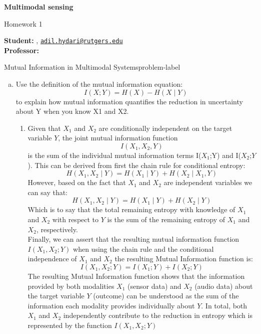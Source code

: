 




	
	\begin{Large}
		\textsf{\textbf{Multimodal sensing}}
		
		Homework 1
	\end{Large}
	
	\vspace{1ex}
	
	\textsf{\textbf{Student:}} , \href{mailto:adil.hydari@rutgers.edu}{\texttt{adil.hydari@rutgers.edu}}\\
	\textsf{\textbf{Professor:}} 
	
	
	\vspace{2ex}
	
	\begin{problem}{Mutual Information in Multimodal Systems}{problem-label}
		\begin{enumerate}[(a)]
			\item Use the definition of the mutual information equation:
			\[
			I(X;Y) = H(X) - H(X \mid Y)
			\]
			to explain how mutual information quantifies the reduction in uncertainty about Y when you know X1 and X2.
			\begin{enumerate}[label = (\roman*)]
				\item Given that $X_1$ and $X_2$ are conditionally independent on the target variable $Y$, the joint mutual information function \[ I(X_1,X_2,Y) \] is the sum of the individual mutual information terms I($X_1$;Y) and I($X_2$;$Y$). This can be derived from first the chain rule for conditional entropy: \[ H(X_1, X_2 \mid Y) = H(X_1 \mid Y) + H(X_2 \mid X_1, Y) \] 
				However, based on the fact that $X_1$ and $X_2$ are independent variables we can say that: 
				\[ H(X_1, X_2 \mid Y) = H(X_1 \mid Y) + H(X_2 \mid Y) \] 
				Which is to say that the total remaining entropy with knowledge of $X_1$ and $X_2$ with respect to $Y$ is the sum of the remaining entropy of $X_1$ and $X_2$, respectively.\\
				Finally, we can assert that the resulting mutual information function  $ I(X_1, X_2; Y) $ when using the chain rule and the conditional independence of $X_1$ and $X_2$ the resulting Mutual Information function is:
				 \[ I(X_1, X_2; Y) = I(X_1; Y) + I(X_2; Y) \]
				The resulting Mutual Information function shows that the information provided by both modalities $X_1$ (sensor data) and $X_2$ (audio data) about the target variable $Y$ (outcome) can be understood as the sum of the information each modality provides individually about $Y$. In total, both $X_1$ and $X_2$ independently contribute to the reduction in entropy which is represented by the function  $I(X_1, X_2; Y)$
			\end{enumerate}
		\end{enumerate}
		\vspace{1cm}
	\end{problem}	

